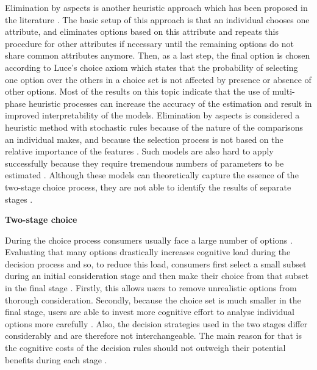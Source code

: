 \documentclass[a4paper,12pt]{article}
\begin{document}
Elimination by aspects is another heuristic approach which has been
proposed in the literature \citep{tversky1972elimination}. The basic setup of this approach is that an individual chooses one attribute, and eliminates options based on this attribute and repeats this procedure for other attributes if necessary until the remaining options do not share common attributes anymore. Then, as a last step, the final option is chosen according to Luce's choice axiom \citep{luce2012individual} which states that the probability of selecting one option over the others in a choice set is not affected by presence or absence of other options. Most of the results on this topic \citep{batsell1985new,gensch1987two,currim1988disaggregate,manrai1989elimination} indicate that the use of multi-phase heuristic processes can increase the accuracy of the estimation and result in improved interpretability of the models. Elimination by aspects is considered a heuristic method with stochastic rules because of the nature of the comparisons an individual makes, and because the selection process is not based on the relative importance of the features 
\citep{aribarg2018advancing}. Such models are also hard to apply successfully because they require tremendous numbers of parameters to be estimated \citep{batsell1985new}. Although these models can theoretically capture the essence of the two-stage choice process, they are not able to identify the results of separate stages \citep{gilbride2004choice}. 

\textbf{Two-stage choice}

During the choice process consumers usually face a large number of options \citep{payne1988adaptive}. Evaluating that many options drastically increases  cognitive load during the decision process and so, to reduce this load, consumers first select a small subset during an initial consideration  stage \citep{paulssen2005self} and then make their choice  from that subset in the final stage \citep{bettman1979memory, gensch1987two, paulssen2005self}. Firstly, this allows users to remove unrealistic options from thorough consideration. Secondly, 
because the choice set is much smaller in the final stage, users are able to invest more cognitive effort to analyse individual options more carefully \citep{gensch1987two}. Also, the decision strategies used in the two stages differ considerably and are therefore not interchangeable. The main reason for that is the cognitive costs of the decision rules should not outweigh their potential benefits during each stage \citep{bettman1990componential}.
\end{document}
